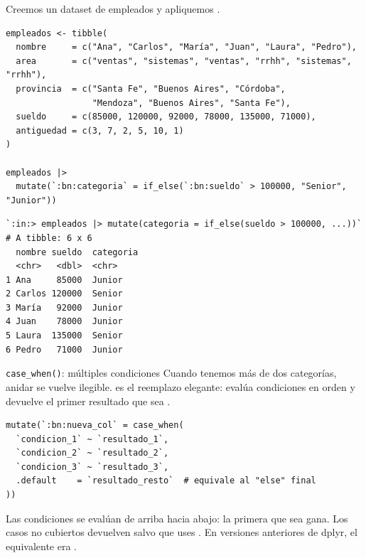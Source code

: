 \documentclass[8pt]{beamer}
\begin{document}
	\begin{frame}[fragile]
		Creemos un dataset de empleados y apliquemos .
\begin{lstlisting}[style=RScript]
empleados <- tibble(
  nombre     = c("Ana", "Carlos", "María", "Juan", "Laura", "Pedro"),
  area       = c("ventas", "sistemas", "ventas", "rrhh", "sistemas", "rrhh"),
  provincia  = c("Santa Fe", "Buenos Aires", "Córdoba",
                 "Mendoza", "Buenos Aires", "Santa Fe"),
  sueldo     = c(85000, 120000, 92000, 78000, 135000, 71000),
  antiguedad = c(3, 7, 2, 5, 10, 1)
)

empleados |>
  mutate(`:bn:categoria` = if_else(`:bn:sueldo` > 100000, "Senior", "Junior"))
\end{lstlisting}
\begin{lstlisting}[style=RConsole]
`:in:> empleados |> mutate(categoria = if_else(sueldo > 100000, ...))`
# A tibble: 6 x 6
  nombre sueldo  categoria
  <chr>   <dbl>  <chr>
1 Ana     85000  Junior
2 Carlos 120000  Senior
3 María   92000  Junior
4 Juan    78000  Junior
5 Laura  135000  Senior
6 Pedro   71000  Junior
\end{lstlisting}
	\end{frame}


	\begin{frame}[fragile]{\texttt{case\_when()}: múltiples condiciones}
		Cuando tenemos más de dos categorías, anidar  se vuelve ilegible.  es el reemplazo elegante: evalúa condiciones en orden y devuelve el primer resultado que sea .

\begin{lstlisting}[style=RScript]
mutate(`:bn:nueva_col` = case_when(
  `condicion_1` ~ `resultado_1`,
  `condicion_2` ~ `resultado_2`,
  `condicion_3` ~ `resultado_3`,
  .default    = `resultado_resto`  # equivale al "else" final
))
\end{lstlisting}

		\begin{block}{}
			Las condiciones se evalúan de arriba hacia abajo: la primera que sea  gana. Los casos no cubiertos devuelven  salvo que uses . En versiones anteriores de dplyr, el equivalente era .
		\end{block}
	\end{frame}
\end{document}
